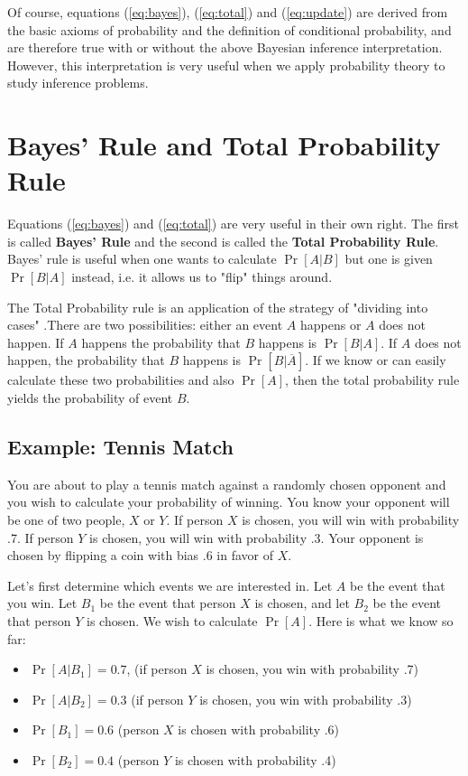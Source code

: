 \documentclass[11pt]{article}
\begin{document}
Of course, equations (\ref{eq:bayes}), (\ref{eq:total}) and
(\ref{eq:update}) are derived from the basic axioms of probability
and the definition of conditional probability, and are therefore
true with or without the above Bayesian inference interpretation.
However, this interpretation is very useful when we apply
probability theory to study inference problems.

\section*{Bayes' Rule and Total Probability Rule}

Equations (\ref{eq:bayes}) and (\ref{eq:total}) are very useful in
their own right. The first is called {\bf Bayes' Rule} and the
second is called the {\bf Total Probability Rule}. Bayes' rule is
useful when one wants to calculate $\Pr [A|B]$ but one is given $\Pr
[B|A]$ instead, i.e. it allows us to "flip" things around. 

The Total
Probability rule is an application of the strategy of "dividing into
cases" .There are two
possibilities: either an event $A$ happens or $A$ does not happen. 
If $A$ happens the probability that $B$ happens is $\Pr [B|A]$. If
$A$ does not happen, the probability that $B$ happens is $\Pr
[B|\overline{A}]$. If we know or can easily calculate these two
probabilities and also $\Pr [A]$, then the total probability rule
yields the probability of event $B$.

\subsection*{Example: Tennis Match}
You are about to play a tennis match against a randomly
chosen opponent and you wish to calculate your probability of winning.
You know your opponent will be one of two people, $X$ or $Y$. If person $X$ is chosen,
you will win with probability .7. If person $Y$ is chosen, you will win with probability .3. 
Your opponent is chosen by flipping a coin with bias .6 in favor of $X$. 

Let's first determine which events we are interested in. Let $A$ be the event that you win.
Let $B_1$ be the event that person $X$ is chosen, and let $B_2$ be the event that person $Y$ is chosen.
We wish to calculate $\Pr[A]$. Here is what we know so far: 

\begin{itemize}

\item $\Pr [A|B_1] = 0.7$, (if person $X$ is chosen, you win with probability .7)

\item $\Pr [A|B_2] = 0.3$ (if person $Y$ is chosen, you win with probability .3)

\item $\Pr [B_1] =0.6$ (person $X$ is chosen with probability .6)

\item $\Pr[B_2] =0.4$ (person $Y$ is chosen with probability .4)

\end{itemize}
\end{document}
